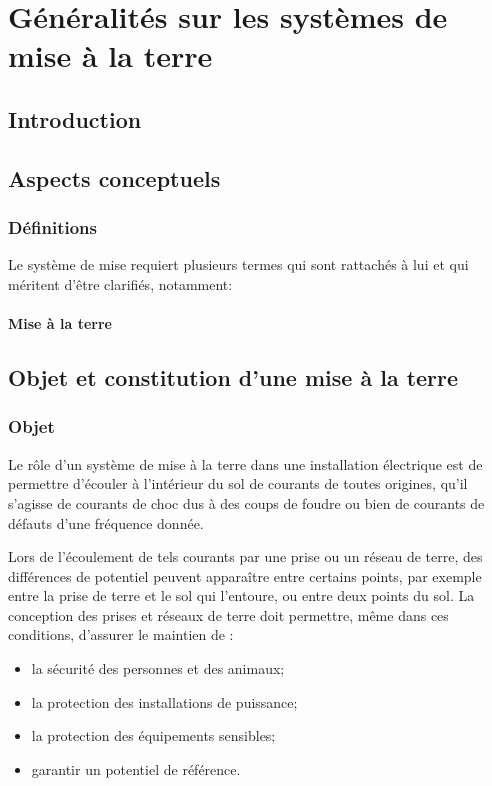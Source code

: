\chapter{Généralités sur les systèmes de mise à la terre}

	\section{Introduction}

		\section{Aspects conceptuels}

			\subsection{Définitions}
				Le système de mise requiert plusieurs termes qui sont rattachés à lui et qui méritent d’être clarifiés, notamment:
				\subsubsection{Mise à la terre}
					
		\section{Objet et constitution d'une mise à la terre}
			\subsection{Objet}
				Le rôle d'un système de mise à la terre dans une installation électrique est de permettre d'écouler à l'intérieur du sol de courants de toutes origines, qu'il s'agisse de courants de choc dus à des coups de foudre ou bien de courants de défauts d'une fréquence donnée.\cite{edf89}

Lors de l'écoulement de tels courants par une prise ou un réseau de terre, des différences de potentiel peuvent apparaître entre certains points, par exemple entre la prise de terre et le sol qui l'entoure, ou entre deux points du sol. La conception des prises et réseaux de terre doit permettre, même dans ces conditions, d'assurer le maintien de :
	\begin{itemize}
		\item la sécurité des personnes et des animaux;
		\item la protection des installations de puissance;
		\item la protection des équipements sensibles;
		\item garantir un potentiel de référence.
	\end{itemize}
	
